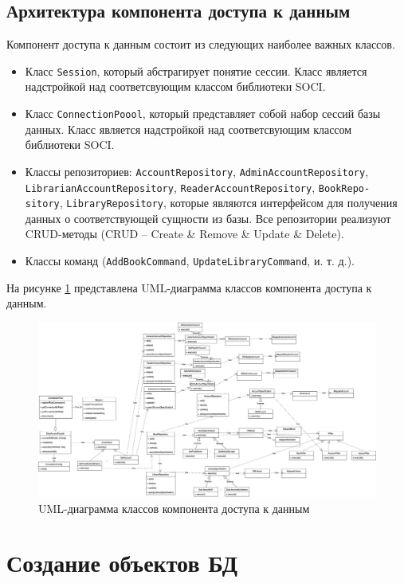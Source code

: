 \subsection{Архитектура компонента доступа к данным}
Компонент доступа к данным состоит из следующих наиболее важных классов.
\begin{itemize}
    \item Класс \texttt{Session}, который абстрагирует понятие сессии. Класс является надстройкой над соответсвующим классом библиотеки SOCI.
    \item Класс \texttt{ConnectionPoool}, который представляет собой набор сессий базы данных. Класс является надстройкой над соответсвующим классом библиотеки SOCI.
    \item Классы репозиториев: \texttt{AccountRepository}, \texttt{AdminAccountRepository}, \texttt{LibrarianAccountRepository}, \texttt{ReaderAccountRepository}, \texttt{BookRepo-}\\ \texttt{sitory}, \texttt{LibraryRepository}, которые являются интерфейсом для получения данных о соответствующей сущности из базы. Все репозитории реализуют CRUD-методы (CRUD -- Create \& Remove \& Update \& Delete).
    \item Классы команд (\texttt{AddBookCommand}, \texttt{UpdateLibraryCommand}, и. т. д.).
    
\end{itemize}
На рисунке \ref{fig:db} представлена UML-диаграмма классов компонента доступа к данным.

\begin{figure}[H]
	\centering
	\includegraphics[width = \linewidth]{img/db.jpg}
	\caption{UML-диаграмма классов компонента доступа к данным}
	\label{fig:db}
\end{figure}

\section{Создание объектов БД}
